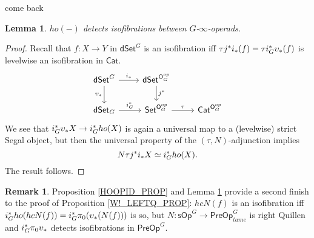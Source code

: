\documentclass[a4paper,10pt
,draft
]{article}%
\numberwithin{equation}{section}
\numberwithin{figure}{section}
\newtheorem{lemma}[equation]{Lemma}%
\theoremstyle{definition} %
\newtheorem{remark}[equation]{Remark}%
\newcommand{\Set}{\ensuremath{\mathsf{Set}}}
\newcommand{\Cat}{\mathsf{Cat}}
\newcommand{\sOp}{\ensuremath{\mathsf{sOp}}}%
\newcommand{\dSet}{\mathsf{dSet}}
\newcommand{\1}{\ensuremath{\mathbbm 1}}%
\begin{document}
come back

\begin{lemma}
      \label{HOXISOFIB_LEM}
      $ho(-)$ detects isofibrations between $G$-$\infty$-operads.
\end{lemma}
\begin{proof}
      Recall that $f \colon X \to Y$ in $\dSet^G$ is an isofibration iff
      \(
      \tau j^{\**}i_{\**}(f) = \tau i_G^{\**}\upsilon_{\**}(f)
      \)
      is levelwise an isofibration in $\Cat$.
      \[
            \begin{tikzcd}
                  \dSet^G \arrow[r, "i_{\**}"] \arrow[d, "\upsilon_{\**}"']
                  &
                  \dSet^{\mathsf O_G^{op}} \arrow[d, "j^{\**}"]
                  \\
                  \dSet_G \arrow[r, "i_G^{\**}"]
                  &
                  \Set^{\mathsf O_G^{op}} \arrow[r, "\tau"]
                  &
                  \Cat^{\mathsf O_G^{op}}
            \end{tikzcd}
      \]
      We see that $i_G^{\**} \upsilon_{\**} X \to i_G^{\**} ho(X)$ is again a universal map to a (levelwise) strict Segal object,
      but then the universal property of the $(\tau, N)$-adjunction implies
      \[
            N\tau j^{\**}i_{\**}X \simeq i_G^{\**} ho(X).
      \]
      The result follows.
\end{proof}

\begin{remark}
      \label{W!_LEFTQ_REM}
      Proposition \ref{HOOPID_PROP} and Lemma \ref{HOXISOFIB_LEM}
      provide a second finish to the proof of Proposition \ref{W!_LEFTQ_PROP}:
      $hcN(f)$ is an isofibration iff
      $i_G^{\**}ho(hcN(f)) = i_G^{\**} \pi_0(\upsilon_{\**}(N(f)))$ is so,
      but $N \colon \sOp^G \to \mathsf{PreOp}^G_{tame}$ is right Quillen
      and $i_G^{\**}\pi_0\upsilon_{\**}$ detects isofibrations in $\mathsf{PreOp}^G$.
\end{remark}










{}

\end{document}
